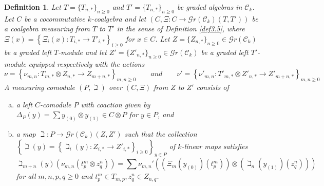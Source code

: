 \documentclass[10pt, colorlinks]{article}
\numberwithin{equation}{section} \DeclareMathSizes{2}{10}{12}{13}
\newtheorem{defn}[thm]{Definition}
\begin{document}
\begin{defn}\label{D5.tj}
    Let $T=\{T_{n,*}\}_{n\geq 0}$ and $T'=\{T_{n,*}\}_{n\geq 0}$ be graded algebras in $\mathcal C_k$. Let $C$ be a cocommutative $k$-coalgebra  and let  $(C,\Xi:C\longrightarrow \mathscr Gr(\mathcal C_k)(T,T'))$ be a coalgebra measuring from $T$ to $T'$ in the sense of Definition \ref{def3.5},  where  $\Xi(x)=\left\{\Xi_i(x):T_{i,*}\longrightarrow T'_{i,*}\right\}_{i\geq 0}$ for $x\in C$. Let $Z=\{Z_{n,*}\}_{n\geq 0}\in \mathscr Gr(\mathcal C_k)$ be a graded left  $T$-module  and let $Z'=\{Z'_{n,*}\}_{n\geq 0}\in \mathscr Gr(\mathcal C_k)$ be a graded left $T'$-module equipped respectively with the actions
    \begin{equation}
        \nu=\left\{\nu_{m,n}:T_{m,*}\otimes Z_{n,*}\longrightarrow Z_{m+n,*}\right\}_{m,n\geq 0}\qquad \textit{and} \qquad\nu'=\left\{\nu'_{m,n}:T'_{m,*}\otimes Z'_{n,*}\longrightarrow Z'_{m+n,*}\right\}_{m,n\geq 0}
    \end{equation} 
     A measuring comodule $(P,\beth)$ over $(C,\Xi)$ from $Z$ to $Z'$ consists of
\begin{enumerate}[(a)]
    \item a left $C$-comodule $P$ with coaction given by $\Delta_P(y)=\sum y_{(0)}\otimes y_{(1)}\in C\otimes P$ for $y\in P$, and
    \item a map $\beth:P\longrightarrow \mathscr Gr(\mathcal C_k)(Z,Z')$ such that the collection $\left\{\beth(y)=\left\{\beth_i(y):Z_{i,*}\longrightarrow Z'_{i,*}\right\}_{i\geq 0}\right\}_{y\in P}$ of $k$-linear maps satisfies 
    \begin{equation}\label{eq5.15p}
        \beth_{m+n}(y)\left(\nu_{m,n}(t^m_p\otimes z^n_q)\right)=\sum \nu_{m,n}'\left(\left(\Xi_m(y_{(0)})(t^m_p)\right)\otimes \left(\beth_n(y_{(1)})(z^n_q)\right)\right)
    \end{equation}
    for all $m,n,p,q\geq 0$ and $t^m_p\in T_{m,p}, z^n_q\in Z_{n,q}$.
\end{enumerate}

\end{defn}
\end{document}
